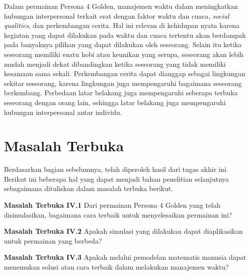 Dalam permainan Persona 4 Golden, manajemen waktu dalam meningkatkan hubungan interpersonal terkait erat dengan faktor waktu dan cuaca, \textit{social qualities}, dan perkembangan cerita. Hal ini relevan di kehidupan nyata karena kegiatan yang dapat dilakukan pada waktu dan cuaca tertentu akan berdampak pada banyaknya pilihan yang dapat dilakukan oleh seseorang. Selain itu ketika seseorang memiliki suatu hobi atau keunikan yang serupa, seseorang akan lebih mudah menjadi dekat dibandingkan ketika seseorang yang tidak memiliki kesamaan sama sekali. Perkembangan cerita dapat dianggap sebagai lingkungan sekitar seseorang, karena lingkungan juga mempengaruhi bagaimana seseorang berkembang. Perbedaan latar belakang juga mempengaruhi seberapa terbuka seseorang dengan orang lain, sehingga latar belakang juga mempengaruhi hubungan interpersonal antar individu.


\section{Masalah Terbuka}
Berdasarkan bagian sebelumnya, telah diperoleh hasil dari tugas akhir ini. Berikut ini beberapa hal yang dapat menjadi bahan penelitian selanjutnya sebagaimana dituliskan dalam masalah terbuka berikut.

\pagebreak
\textbf{Masalah Terbuka IV.1} Dari permainan Persona 4 Golden yang telah disimulasikan, bagaimana cara terbaik untuk menyelesaikan permainan ini?

\textbf{Masalah Terbuka IV.2} Apakah simulasi yang dilakukan dapat diaplikasikan untuk permainan yang berbeda?

\textbf{Masalah Terbuka IV.3} Apakah melalui pemodelan matematis manusia dapat menemukan solusi atau cara terbaik dalam melakukan manajemen waktu?
